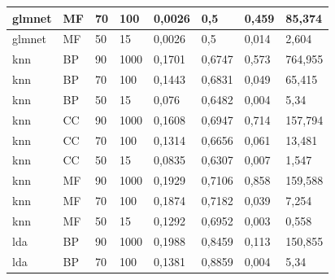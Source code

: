 \documentclass[12pt]{report}
\begin{document}
\begin{appendices}
\begin{longtable}[h]{|l|l|l|l|l|l|l|l|}
glmnet             & MF            & 70                & 100                & 0,0026         & 0,5            & 0,459                    & 85,374               \\ \hline
glmnet             & MF            & 50                & 15                 & 0,0026         & 0,5            & 0,014                    & 2,604                \\ \hline
knn                & BP            & 90                & 1000               & 0,1701         & 0,6747         & 0,573                    & 764,955              \\ \hline
knn                & BP            & 70                & 100                & 0,1443         & 0,6831         & 0,049                    & 65,415               \\ \hline
knn                & BP            & 50                & 15                 & 0,076          & 0,6482         & 0,004                    & 5,34                 \\ \hline
knn                & CC            & 90                & 1000               & 0,1608         & 0,6947         & 0,714                    & 157,794              \\ \hline
knn                & CC            & 70                & 100                & 0,1314         & 0,6656         & 0,061                    & 13,481               \\ \hline
knn                & CC            & 50                & 15                 & 0,0835         & 0,6307         & 0,007                    & 1,547                \\ \hline
knn                & MF            & 90                & 1000               & 0,1929         & 0,7106         & 0,858                    & 159,588              \\ \hline
knn                & MF            & 70                & 100                & 0,1874         & 0,7182         & 0,039                    & 7,254                \\ \hline
knn                & MF            & 50                & 15                 & 0,1292         & 0,6952         & 0,003                    & 0,558                \\  \hline
lda                & BP            & 90                & 1000               & 0,1988         & 0,8459         & 0,113                    & 150,855              \\ \hline
lda                & BP            & 70                & 100                & 0,1381         & 0,8859         & 0,004                    & 5,34                 \\ \hline

\end{longtable}
\end{appendices}
\end{document}
